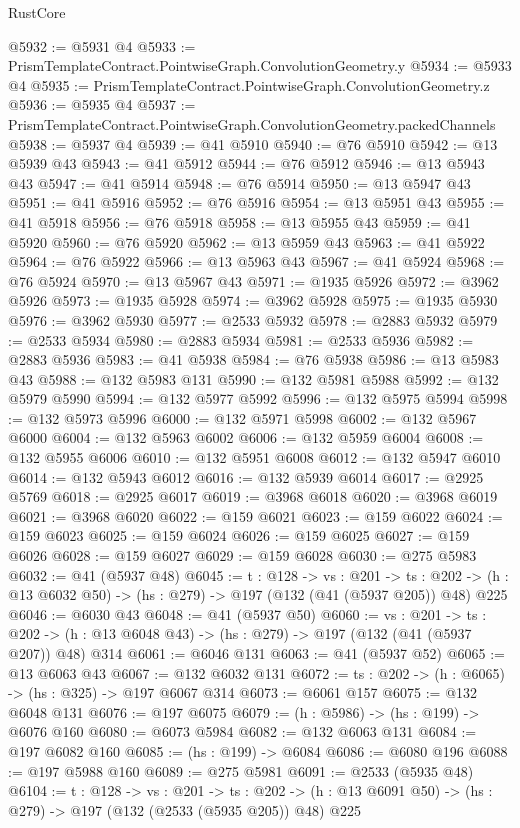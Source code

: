 \begin{lexlean}{RustCore}
\begin{coremodule}
@5932 := @5931 @4
@5933 := PrismTemplateContract.PointwiseGraph.ConvolutionGeometry.y
@5934 := @5933 @4
@5935 := PrismTemplateContract.PointwiseGraph.ConvolutionGeometry.z
@5936 := @5935 @4
@5937 := PrismTemplateContract.PointwiseGraph.ConvolutionGeometry.packedChannels
@5938 := @5937 @4
@5939 := @41 @5910
@5940 := @76 @5910
@5942 := @13 @5939 @43
@5943 := @41 @5912
@5944 := @76 @5912
@5946 := @13 @5943 @43
@5947 := @41 @5914
@5948 := @76 @5914
@5950 := @13 @5947 @43
@5951 := @41 @5916
@5952 := @76 @5916
@5954 := @13 @5951 @43
@5955 := @41 @5918
@5956 := @76 @5918
@5958 := @13 @5955 @43
@5959 := @41 @5920
@5960 := @76 @5920
@5962 := @13 @5959 @43
@5963 := @41 @5922
@5964 := @76 @5922
@5966 := @13 @5963 @43
@5967 := @41 @5924
@5968 := @76 @5924
@5970 := @13 @5967 @43
@5971 := @1935 @5926
@5972 := @3962 @5926
@5973 := @1935 @5928
@5974 := @3962 @5928
@5975 := @1935 @5930
@5976 := @3962 @5930
@5977 := @2533 @5932
@5978 := @2883 @5932
@5979 := @2533 @5934
@5980 := @2883 @5934
@5981 := @2533 @5936
@5982 := @2883 @5936
@5983 := @41 @5938
@5984 := @76 @5938
@5986 := @13 @5983 @43
@5988 := @132 @5983 @131
@5990 := @132 @5981 @5988
@5992 := @132 @5979 @5990
@5994 := @132 @5977 @5992
@5996 := @132 @5975 @5994
@5998 := @132 @5973 @5996
@6000 := @132 @5971 @5998
@6002 := @132 @5967 @6000
@6004 := @132 @5963 @6002
@6006 := @132 @5959 @6004
@6008 := @132 @5955 @6006
@6010 := @132 @5951 @6008
@6012 := @132 @5947 @6010
@6014 := @132 @5943 @6012
@6016 := @132 @5939 @6014
@6017 := @2925 @5769
@6018 := @2925 @6017
@6019 := @3968 @6018
@6020 := @3968 @6019
@6021 := @3968 @6020
@6022 := @159 @6021
@6023 := @159 @6022
@6024 := @159 @6023
@6025 := @159 @6024
@6026 := @159 @6025
@6027 := @159 @6026
@6028 := @159 @6027
@6029 := @159 @6028
@6030 := @275 @5983
@6032 := @41 (@5937 @48)
@6045 := {t : @128} ->
  {vs : @201} ->
  {ts : @202} -> (h : @13 @6032 @50) -> (hs : @279) -> @197 (@132 (@41 (@5937 @205)) @48) @225
@6046 := @6030 @43
@6048 := @41 (@5937 @50)
@6060 := {vs : @201} ->
  {ts : @202} -> (h : @13 @6048 @43) -> (hs : @279) -> @197 (@132 (@41 (@5937 @207)) @48) @314
@6061 := @6046 @131
@6063 := @41 (@5937 @52)
@6065 := @13 @6063 @43
@6067 := @132 @6032 @131
@6072 := {ts : @202} -> (h : @6065) -> (hs : @325) -> @197 @6067 @314
@6073 := @6061 @157
@6075 := @132 @6048 @131
@6076 := @197 @6075
@6079 := (h : @5986) -> (hs : @199) -> @6076 @160
@6080 := @6073 @5984
@6082 := @132 @6063 @131
@6084 := @197 @6082 @160
@6085 := (hs : @199) -> @6084
@6086 := @6080 @196
@6088 := @197 @5988 @160
@6089 := @275 @5981
@6091 := @2533 (@5935 @48)
@6104 := {t : @128} ->
  {vs : @201} ->
  {ts : @202} -> (h : @13 @6091 @50) -> (hs : @279) -> @197 (@132 (@2533 (@5935 @205)) @48) @225

\end{coremodule}
\end{lexlean}
